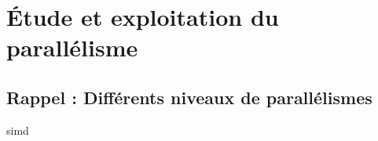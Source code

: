 \documentclass[../main.tex]{subfiles}
\begin{document}
\section{Étude et exploitation du parallélisme}

\subsection{Rappel : Différents niveaux de parallélismes}

\begin{frame}{\acrfull{simd}}
  \begin{columns}
    \begin{column}{.3\linewidth}
      \centering
      \includegraphics[

\end{column}
\end{columns}
\end{frame}
\end{document}
